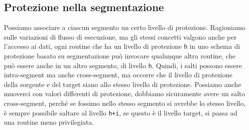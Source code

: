 \documentclass[12pt, oneside]{extbook}
\begin{document}
\subsection{Protezione nella segmentazione}
Possiamo associare a ciascun segmento un certo livello di protezione. Ragioniamo sulle variazioni di flusso di esecuzione, ma gli stessi concetti valgono anche per l'accesso ai dati, ogni routine che ha un livello di protezione \texttt{h} in uno schema di protezione basato su segmentazione può invocare qualunque altra routine, che può essere anche in un altro segmento, di livello \texttt{h}. Quindi, i salti possono essere intra-segment ma anche cross-segment, ma occorre che il livello di protezione della sorgente e del target siano allo stesso livello di protezione. Possiamo anche muoverci con valori differenti di protezione, dobbiamo sicuramente avere un salto cross-segment, perché se fossimo nello stesso segmento si avrebbe lo stesso livello, è sempre possibile saltare al livello \texttt{h+i}, se questo è il livello target, si passa ad una routine meno privilegiata.
\end{document}

